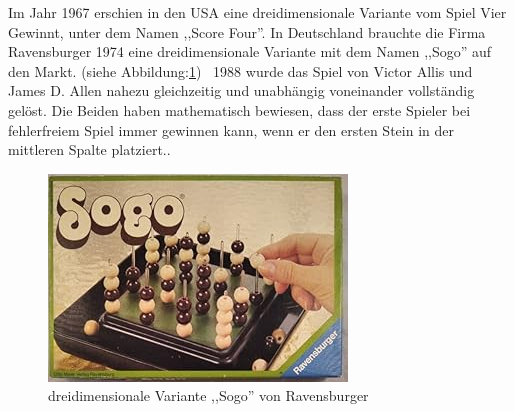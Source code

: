 Im Jahr 1967 erschien in den USA eine dreidimensionale Variante vom Spiel Vier Gewinnt, unter dem Namen ,,Score Four''. In Deutschland brauchte die Firma Ravensburger 1974 eine dreidimensionale Variante mit dem Namen ,,Sogo'' auf den Markt. (siehe Abbildung:\ref{fig:Sogo}) \
1988 wurde das Spiel von Victor Allis und James D. Allen nahezu gleichzeitig und unabhängig voneinander vollständig gelöst. Die Beiden haben mathematisch bewiesen, dass der erste Spieler bei fehlerfreiem Spiel immer gewinnen kann, wenn er den ersten Stein in der mittleren Spalte platziert.\autocite{wikipedia_vier_gewinnt}.

\begin{figure}[H]
	\centering
	\includegraphics[width=0.8\linewidth]{images/Sogo}
	\caption[Sogo von Ravensburger \autocite{abebooks_image}]{dreidimensionale Variante ,,Sogo'' von Ravensburger}
	\label{fig:Sogo}
\end{figure}
\newpage

